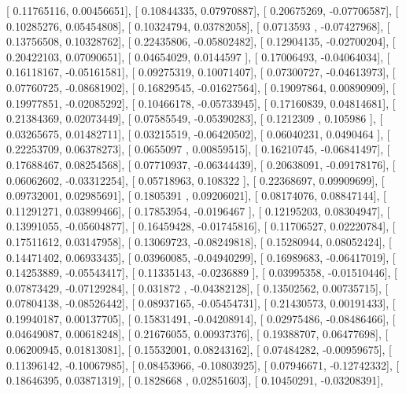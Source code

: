 \documentclass{article}
\begin{document}
       [ 0.11765116,  0.00456651],
       [ 0.10844335,  0.07970887],
       [ 0.20675269, -0.07706587],
       [ 0.10285276,  0.05454808],
       [ 0.10324794,  0.03782058],
       [ 0.0713593 , -0.07427968],
       [ 0.13756508,  0.10328762],
       [ 0.22435806, -0.05802482],
       [ 0.12904135, -0.02700204],
       [ 0.20422103,  0.07090651],
       [ 0.04654029,  0.0144597 ],
       [ 0.17006493, -0.04064034],
       [ 0.16118167, -0.05161581],
       [ 0.09275319,  0.10071407],
       [ 0.07300727, -0.04613973],
       [ 0.07760725, -0.08681902],
       [ 0.16829545, -0.01627564],
       [ 0.19097864,  0.00890909],
       [ 0.19977851, -0.02085292],
       [ 0.10466178, -0.05733945],
       [ 0.17160839,  0.04814681],
       [ 0.21384369,  0.02073449],
       [ 0.07585549, -0.05390283],
       [ 0.1212309 ,  0.105986  ],
       [ 0.03265675,  0.01482711],
       [ 0.03215519, -0.06420502],
       [ 0.06040231,  0.0490464 ],
       [ 0.22253709,  0.06378273],
       [ 0.0655097 ,  0.00859515],
       [ 0.16210745, -0.06841497],
       [ 0.17688467,  0.08254568],
       [ 0.07710937, -0.06344439],
       [ 0.20638091, -0.09178176],
       [ 0.06062602, -0.03312254],
       [ 0.05718963,  0.108322  ],
       [ 0.22368697,  0.09909699],
       [ 0.09732001,  0.02985691],
       [ 0.1805391 ,  0.09206021],
       [ 0.08174076,  0.08847144],
       [ 0.11291271,  0.03899466],
       [ 0.17853954, -0.0196467 ],
       [ 0.12195203,  0.08304947],
       [ 0.13991055, -0.05604877],
       [ 0.16459428, -0.01745816],
       [ 0.11706527,  0.02220784],
       [ 0.17511612,  0.03147958],
       [ 0.13069723, -0.08249818],
       [ 0.15280944,  0.08052424],
       [ 0.14471402,  0.06933435],
       [ 0.03960085, -0.04940299],
       [ 0.16989683, -0.06417019],
       [ 0.14253889, -0.05543417],
       [ 0.11335143, -0.0236889 ],
       [ 0.03995358, -0.01510446],
       [ 0.07873429, -0.07129284],
       [ 0.031872  , -0.04382128],
       [ 0.13502562,  0.00735715],
       [ 0.07804138, -0.08526442],
       [ 0.08937165, -0.05454731],
       [ 0.21430573,  0.00191433],
       [ 0.19940187,  0.00137705],
       [ 0.15831491, -0.04208914],
       [ 0.02975486, -0.08486466],
       [ 0.04649087,  0.00618248],
       [ 0.21676055,  0.00937376],
       [ 0.19388707,  0.06477698],
       [ 0.06200945,  0.01813081],
       [ 0.15532001,  0.08243162],
       [ 0.07484282, -0.00959675],
       [ 0.11396142, -0.10067985],
       [ 0.08453966, -0.10803925],
       [ 0.07946671, -0.12742332],
       [ 0.18646395,  0.03871319],
       [ 0.1828668 ,  0.02851603],
       [ 0.10450291, -0.03208391],
\end{document}
